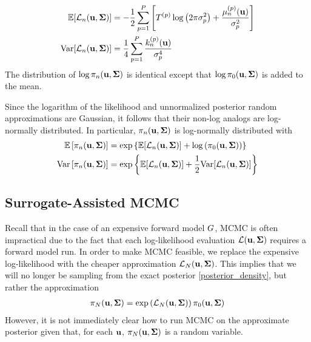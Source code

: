 \documentclass[12pt]{article}
\begin{document}
\begin{align}
\mathbb{E}[\mathcal{L}_{n}(\mathbf{u}, \boldsymbol{\Sigma})] &= -\frac{1}{2} \sum_{p = 1}^{P} \left[{T}^{(p)} \log\left(2\pi \sigma_{p}^2 \right) + \frac{\mu_{n}^{(p)}(\mathbf{u})}{\sigma_{p}^2} \right] \label{llik_approx_mean} \\
\mathrm{Var}[\mathcal{L}_{n}(\mathbf{u}, \boldsymbol{\Sigma})] &= \frac{1}{4} \sum_{p = 1}^{P} \frac{k_{n}^{(p)}(\mathbf{u})}{\sigma_{p}^4} \label{llik_approx_var}
\end{align}
The distribution of $\log \pi_{n}(\mathbf{u}, \boldsymbol{\Sigma})$ is identical except that $\log \pi_0(\mathbf{u}, \boldsymbol{\Sigma})$ is added to the mean. 

Since the logarithm of the likelihood and unnormalized posterior random approximations are Gaussian, it follows that their non-log analogs are log-normally distributed.
In particular, $\pi_{n}(\mathbf{u}, \boldsymbol{\Sigma})$ is log-normally distributed with 
\begin{align}
\mathbb{E}\left[\pi_{n}(\mathbf{u}, \boldsymbol{\Sigma})\right] &= \exp\left\{\mathbb{E}[\mathcal{L}_{n}(\mathbf{u}, \boldsymbol{\Sigma})] + \log\left(\pi_0(\mathbf{u}, \boldsymbol{\Sigma})\right) \right\} \\
\mathrm{Var}\left[\pi_{n}(\mathbf{u}, \boldsymbol{\Sigma})\right] &= \exp\left\{\mathbb{E}[\mathcal{L}_{n}(\mathbf{u}, \boldsymbol{\Sigma})] + \frac{1}{2}\mathrm{Var}[\mathcal{L}_{n}(\mathbf{u}, \boldsymbol{\Sigma})] \right\} \label{post_approx_var}
\end{align}

\subsection{Surrogate-Assisted MCMC}
Recall that in the case of an expensive forward model $G$, MCMC is often impractical due to the fact that each log-likelihood evaluation $\mathcal{L}(\mathbf{u}, \boldsymbol{\Sigma})$ requires a forward model 
 run. In order to make MCMC feasible, we replace the expensive log-likelihood with the cheaper approximation $\mathcal{L}_{N}(\mathbf{u}, \boldsymbol{\Sigma})$. This implies that we will no longer be 
 sampling from the exact posterior \ref{posterior_density}, but rather the approximation
 \begin{align}
 \pi_{N}(\mathbf{u}, \boldsymbol{\Sigma}) = \exp\left(\mathcal{L}_{N}(\mathbf{u}, \boldsymbol{\Sigma})\right)\pi_0(\mathbf{u}, \boldsymbol{\Sigma}) \label{approx_posterior_density}
 \end{align}
 However, it is not immediately clear how to run MCMC on the approximate posterior given that, for each $\mathbf{u}$,  $\pi_{N}(\mathbf{u}, \boldsymbol{\Sigma})$ is a random variable. 
\end{document}
